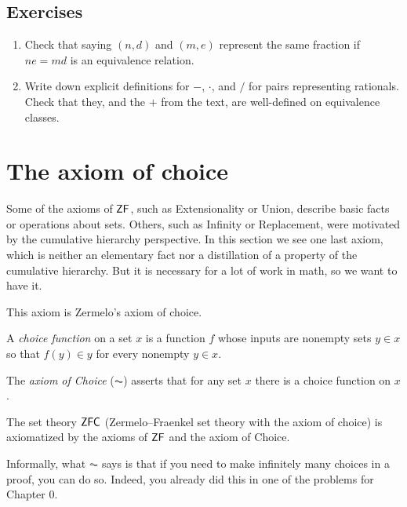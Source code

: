 \documentclass[10pt]{amsart}
\begin{document}
\subsection*{Exercises}

\begin{enumerate}
\item Check that saying $(n,d)$ and $(m,e)$ represent the same fraction if $ne = md$ is an equivalence relation.
\item Write down explicit definitions for $-$, $\cdot$, and $/$ for pairs representing rationals. Check that they, and the $+$ from the text, are well-defined on equivalence classes.
\end{enumerate}

\newpage

\section{The axiom of choice}

Some of the axioms of $\mathsf{ZF}$, such as Extensionality or Union, describe basic facts or operations about sets. Others, such as Infinity or Replacement, were motivated by the cumulative hierarchy perspective. In this section we see one last axiom, which is neither an elementary fact nor a distillation of a property of the cumulative hierarchy. But it is necessary for a lot of work in math, so we want to have it. 

This axiom is Zermelo's axiom of choice.

\begin{definition}
A \emph{choice function} on a set $x$ is a function $f$ whose inputs are nonempty sets $y \in x$ so that $f(y) \in y$ for every nonempty $y \in x$.
\end{definition}

\begin{definition}[Zermelo, 1904]
The \emph{axiom of Choice} ($\AC$) asserts that for any set $x$ there is a choice function on $x$.
\end{definition}

\begin{definition}
The set theory $\mathsf{ZFC}$ (Zermelo--Fraenkel set theory with the axiom of choice) is axiomatized by the axioms of $\mathsf{ZF}$ and the axiom of Choice.
\end{definition}

Informally, what $\AC$ says is that if you need to make infinitely many choices in a proof, you can do so. Indeed, you already did this in one of the problems for Chapter 0.
\end{document}
